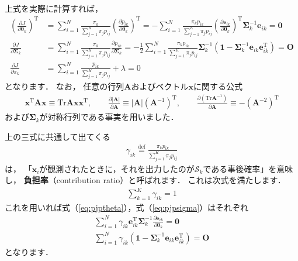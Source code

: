 ﻿\documentclass{jsarticle}
\begin{document}
上式を実際に計算すれば，
\begin{align}
\left(\frac{\partial J}{\partial\bm{\theta}_{k}}\right)^{\mathrm{T}}
&=\sum_{i=1}^{N}\frac{\pi_{k}}{\sum_{j=1}^{K}\pi_{j}p_{ij}}\left(\frac{\partial p_{ik}}{\partial\bm{\theta}_{k}}\right)^{\mathrm{T}}
 =-\sum_{i=1}^{N}\frac{\pi_{k}p_{ik}}{\sum_{j=1}^{K}\pi_{j}p_{ij}}
\left(\frac{\partial\bm{e}_{ik}}{\partial\bm{\theta}_{k}}\right)^{\mathrm{T}}
\bm{\Sigma}_{k}^{-1}\bm{e}_{ik}
 =\bm{0}
\label{eq:pjptheta}
 \\
\frac{\partial J}{\partial\bm{\Sigma}_{k}}
&=\sum_{i=1}^{N}\frac{\pi_{k}}{\sum_{j=1}^{K}\pi_{j}p_{ij}}
\frac{\partial p_{ik}}{\partial\bm{\Sigma}_{k}}
 =-\frac{1}{2}\sum_{i=1}^{N}\frac{\pi_{k}p_{ik}}{\sum_{j=1}^{K}\pi_{j}p_{ij}}
\bm{\Sigma}_{k}^{-1}\left(
\bm{1}-\bm{\Sigma}_{k}^{-1}\bm{e}_{ik}\bm{e}_{ik}^{\mathrm{T}}
\right)
 =\bm{O}
\label{eq:pjpsigma}
 \\
\frac{\partial J}{\partial\pi_{k}}
&=\sum_{i=1}^{N}\frac{p_{ik}}{\sum_{j=1}^{K}\pi_{j}p_{ij}}+\lambda=0
\label{eq:pjppi}
\end{align}
となります．
なお，
任意の行列$\bm{A}$およびベクトル$\bm{x}$に関する公式
\begin{align*}
\bm{x}^{\mathrm{T}}\bm{A}\bm{x}\equiv{\mathrm{Tr}}\bm{A}\bm{x}\bm{x}^{\mathrm{T}},
\qquad
\frac{\partial|\bm{A}|}{\partial\bm{A}}\equiv|\bm{A}|(\bm{A}^{-1})^{\mathrm{T}},
\qquad
\frac{\partial\left({\mathrm{Tr}}\bm{A}^{-1}\right)}{\partial\bm{A}}\equiv-(\bm{A}^{-2})^{\mathrm{T}}
\end{align*}
および$\bm{\Sigma}_{k}$が対称行列である事実を用いました．

上の三式に共通して出てくる
\begin{align}
\gamma_{ik}\overset{\mathrm{def}}{=}\frac{\pi_{k}p_{ik}}{\sum_{j=1}^{K}\pi_{j}p_{ij}}
\label{eq:contribution_ratio}
\end{align}
は，
「$\bm{x}_{i}$が観測されたときに，それを出力したのが$\mathcal{S}_{k}$である事後確率」を意味し，
{\bf 負担率}（contribution ratio）と呼ばれます．
これは次式を満たします．
\begin{align}
\sum_{k=1}^{K}\gamma_{ik}=1
\label{eq:gamma_sum}
\end{align}
これを用いれば式（\ref{eq:pjptheta}），式（\ref{eq:pjpsigma}）はそれぞれ
\begin{align}
\sum_{i=1}^{N}\gamma_{ik}\bm{e}_{ik}^{\mathrm{T}}\bm{\Sigma}_{k}^{-1}\frac{\partial\bm{e}_{ik}}{\partial\bm{\theta}_{k}}=\bm{0}
\label{eq:pjptheta_cr}
\\
\sum_{i=1}^{N}\gamma_{ik}\left(
\bm{1}-\bm{\Sigma}_{k}^{-1}\bm{e}_{ik}\bm{e}_{ik}^{\mathrm{T}}
\right)
=\bm{O}
\label{eq:pjpsigma_cr}
\end{align}
となります．
\end{document}
